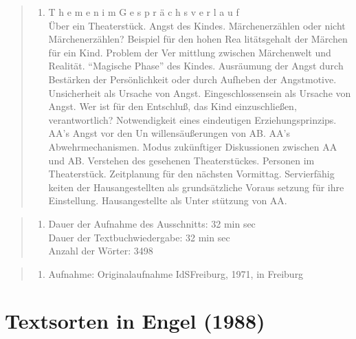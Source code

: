 \documentclass[
  letterpaper,
]{scrbook}
\providecommand{\tightlist}{%
  \setlength{\itemsep}{0pt}\setlength{\parskip}{0pt}}\usepackage{longtable,booktabs,array}
\begin{document}
\begin{quote}
\begin{enumerate}
\def\labelenumi{(\arabic{enumi})}
\setcounter{enumi}{2}
\tightlist
\item
  T h e m e n i m G e s p r ä c h s v e r l a u f\\
  Über ein Theaterstück. Angst des Kindes. Märchenerzählen oder nicht
  Märchenerzählen? Beispiel für den hohen Rea litätsgehalt der Märchen
  für ein Kind. Problem der Ver mittlung zwischen Märchenwelt und
  Realität. ``Magische Phase'' des Kindes. Ausräumung der Angst durch
  Bestärken der Persönlichkeit oder durch Aufheben der Angstmotive.
  Unsicherheit als Ursache von Angst. Eingeschlossensein als Ursache von
  Angst. Wer ist für den Entschluß, das Kind einzuschließen,
  verantwortlich? Notwendigkeit eines eindeutigen Erziehungsprinzips.
  AA's Angst vor den Un willensäußerungen von AB. AA's
  Abwehrmechanismen. Modus zukünftiger Diskussionen zwischen AA und AB.
  Verstehen des gesehenen Theaterstückes. Personen im Theaterstück.
  Zeitplanung für den nächsten Vormittag. Servierfähig keiten der
  Hausangestellten als grundsätzliche Voraus setzung für ihre
  Einstellung. Hausangestellte als Unter stützung von AA.
\end{enumerate}
\end{quote}

\begin{quote}
\begin{enumerate}
\def\labelenumi{(\arabic{enumi})}
\setcounter{enumi}{3}
\tightlist
\item
  Dauer der Aufnahme des Ausschnitts: 32 min sec\\
  Dauer der Textbuchwiedergabe: 32 min sec\\
  Anzahl der Wörter: 3498
\end{enumerate}
\end{quote}

\begin{quote}
\begin{enumerate}
\def\labelenumi{(\arabic{enumi})}
\setcounter{enumi}{4}
\tightlist
\item
  Aufnahme: Originalaufnahme IdSFreiburg, 1971, in Freiburg
\end{enumerate}
\end{quote}

\hypertarget{textsorten-in-engel-1988}{%
\section{Textsorten in Engel (1988)}\label{textsorten-in-engel-1988}}
\end{document}
